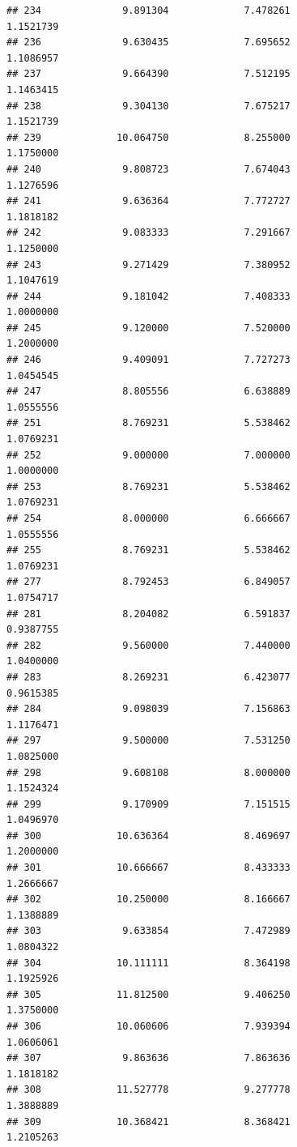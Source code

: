 \documentclass[]{article}
\begin{document}
\begin{verbatim}
## 234              9.891304             7.478261               1.1521739
## 236              9.630435             7.695652               1.1086957
## 237              9.664390             7.512195               1.1463415
## 238              9.304130             7.675217               1.1521739
## 239             10.064750             8.255000               1.1750000
## 240              9.808723             7.674043               1.1276596
## 241              9.636364             7.772727               1.1818182
## 242              9.083333             7.291667               1.1250000
## 243              9.271429             7.380952               1.1047619
## 244              9.181042             7.408333               1.0000000
## 245              9.120000             7.520000               1.2000000
## 246              9.409091             7.727273               1.0454545
## 247              8.805556             6.638889               1.0555556
## 251              8.769231             5.538462               1.0769231
## 252              9.000000             7.000000               1.0000000
## 253              8.769231             5.538462               1.0769231
## 254              8.000000             6.666667               1.0555556
## 255              8.769231             5.538462               1.0769231
## 277              8.792453             6.849057               1.0754717
## 281              8.204082             6.591837               0.9387755
## 282              9.560000             7.440000               1.0400000
## 283              8.269231             6.423077               0.9615385
## 284              9.098039             7.156863               1.1176471
## 297              9.500000             7.531250               1.0825000
## 298              9.608108             8.000000               1.1524324
## 299              9.170909             7.151515               1.0496970
## 300             10.636364             8.469697               1.2000000
## 301             10.666667             8.433333               1.2666667
## 302             10.250000             8.166667               1.1388889
## 303              9.633854             7.472989               1.0804322
## 304             10.111111             8.364198               1.1925926
## 305             11.812500             9.406250               1.3750000
## 306             10.060606             7.939394               1.0606061
## 307              9.863636             7.863636               1.1818182
## 308             11.527778             9.277778               1.3888889
## 309             10.368421             8.368421               1.2105263

\end{verbatim}
\end{document}
